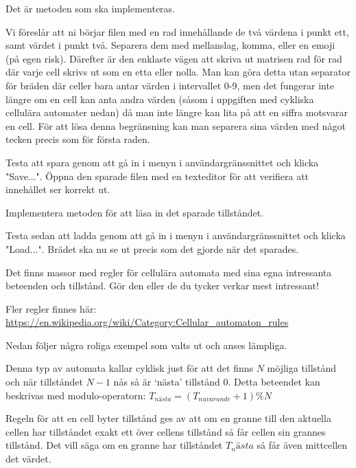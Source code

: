         	Det är metoden  som ska implementeras.
        
        Vi föreslår att ni börjar filen med en rad innehållande de två värdena i punkt ett, samt värdet i punkt två. Separera dem med mellanslag, komma, eller en emoji (på egen risk). Därefter är den enklaste vägen att skriva ut matrisen rad för rad där varje cell skrivs ut som en etta eller nolla. Man kan göra detta utan separator för bräden där celler bara antar värden i intervallet 0-9, men det fungerar inte längre om en cell kan anta andra värden (såsom i uppgiften med cykliska cellulära automater nedan) då man inte längre kan lita på att en siffra motsvarar en cell. För att lösa denna begränsning kan man separera sina värden med något tecken precis som för första raden.
        
        Testa att spara genom att gå in i menyn i användargränssnittet och klicka "Save...". Öppna den sparade filen med en texteditor för att verifiera att innehållet ser korrekt ut.
        
    
        Implementera metoden  för att läsa in det sparade tillståndet.
        
        Testa sedan att ladda genom att gå in i menyn i användargränssnittet och klicka "Load...". Brädet ska nu se ut precis som det gjorde när det sparades.


    Det finns massor med regler för cellulära automata med sina egna intressanta beteenden och tillstånd.
    Gör den eller de du tycker verkar mest intressant!

    Fler regler finnes här: \url{https://en.wikipedia.org/wiki/Category:Cellular_automaton_rules}

    Nedan följer några roliga exempel som valts ut och anses lämpliga.


        Denna typ av automata kallar cyklisk just för att det finns $N$ möjliga tillstånd och när tillståndet $N-1$ nås så är `nästa' tillstånd $0$.
        Detta beteendet kan beskrivas med modulo-operatorn: $T_{nästa} = (T_{nuvarande} + 1) \% N$

        Regeln för att en cell byter tillstånd ges av att om en granne till den aktuella cellen har tillståndet exakt ett över cellens tillstånd så får cellen sin grannes tillstånd. Det vill säga om en granne har tillståndet $T_nästa$ så får även mittcellen det värdet.

